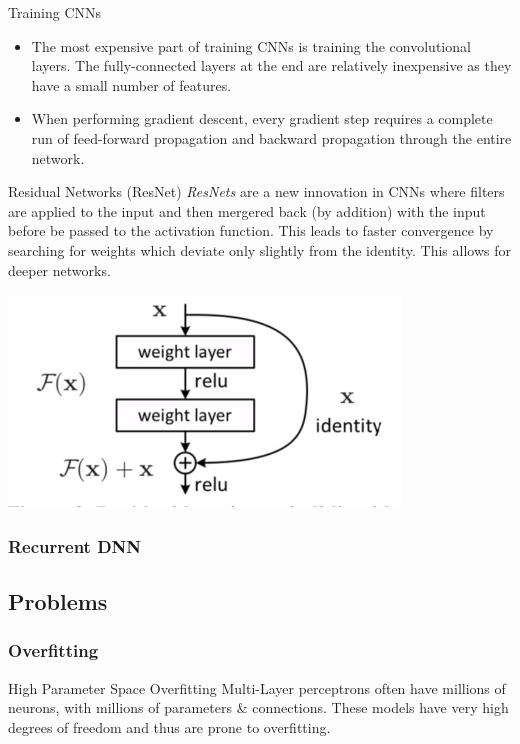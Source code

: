 \documentclass[11pt,a4paper]{article}
\begin{document}
\begin{remark}{Training CNNs}
  \begin{itemize}
    \item The most expensive part of training CNNs is training the convolutional layers. The fully-connected layers at the end are relatively inexpensive as they have a small number of features.
    \item When performing gradient descent, every gradient step requires a complete run of feed-forward propagation and backward propagation through the entire network.
  \end{itemize}
\end{remark}

\begin{proposition}{Residual Networks (ResNet)}
  \textit{ResNets} are a new innovation in CNNs where filters are applied to the input and then mergered back (by addition) with the input before be passed to the activation function. This leads to faster convergence by searching for weights which deviate only slightly from the identity. This allows for deeper networks.
  \begin{center}
    \includegraphics[width=.35\textwidth]{ResNet.PNG}
  \end{center}
\end{proposition}

\subsubsection{Recurrent DNN}

\subsection{Problems}

\subsubsection{Overfitting}

\begin{proposition}{High Parameter Space Overfitting}
  Multi-Layer perceptrons often have millions of neurons, with millions of parameters \& connections. These models have very high degrees of freedom and thus are prone to overfitting.
\end{proposition}
\end{document}
